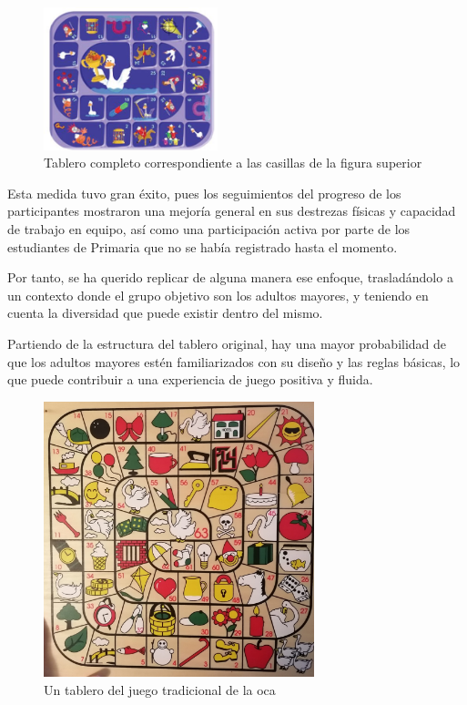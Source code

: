 \begin{figure}[h]
	\centering
	\includegraphics[width=0.45\textwidth]{imgs/oca-primaria.JPG}
	\caption{Tablero completo correspondiente a las casillas de la figura superior \parencite{experienciaOca}}
	\label{fig:oca-primaria}
\end{figure}


Esta medida tuvo gran éxito, pues los seguimientos del progreso de los participantes mostraron una mejoría general en sus destrezas físicas y capacidad de trabajo en equipo, así como una participación activa por parte de los estudiantes de Primaria que no se había registrado hasta el momento.

Por tanto, se ha querido replicar de alguna manera ese enfoque, trasladándolo a un contexto donde el grupo objetivo son los adultos mayores, y teniendo en cuenta la diversidad que puede existir dentro del mismo. 

Partiendo de la estructura del tablero original, hay una mayor probabilidad de que los adultos mayores estén familiarizados con su diseño y las reglas básicas, lo que puede contribuir a una experiencia de juego positiva y fluida.

\begin{figure}[H]
	\centering
	\includegraphics[width=0.7\textwidth]{imgs/oca-tradicional.jpg}
	\caption{Un tablero del juego tradicional de la oca}
	\label{fig:oca-tradicional}
\end{figure}


